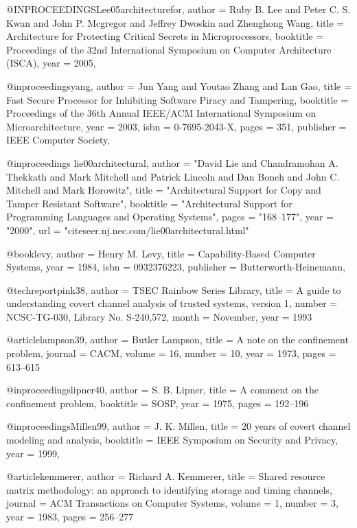 @INPROCEEDINGS{Lee05architecturefor,
    author = {Ruby B. Lee and Peter C. S. Kwan and John P. Mcgregor and Jeffrey Dwoskin and Zhenghong Wang},
    title = {Architecture for Protecting Critical Secrets in Microprocessors},
    booktitle = {Proceedings of the 32nd International Symposium on Computer Architecture (ISCA)},
    year = {2005},
}

@inproceedings{yang,
 author = {Jun Yang and Youtao Zhang and Lan Gao},
 title = {Fast Secure Processor for Inhibiting Software Piracy and Tampering},
 booktitle = {Proceedings of the 36th Annual IEEE/ACM International Symposium on Microarchitecture},
 year = {2003},
 isbn = {0-7695-2043-X},
 pages = {351},
 publisher = {IEEE Computer Society},
 }

@inproceedings{ lie00architectural,
    author = "David Lie and Chandramohan A. Thekkath and Mark Mitchell and Patrick Lincoln and Dan Boneh and John C. Mitchell and Mark Horowitz",
    title = "{Architectural Support for Copy and Tamper Resistant Software}",
    booktitle = "Architectural Support for Programming Languages and Operating Systems",
    pages = "168--177",
    year = "2000",
    url = "citeseer.nj.nec.com/lie00architectural.html" }

@book{levy,
 author = {Henry M. Levy},
 title = {Capability-Based Computer Systems},
 year = {1984},
 isbn = {0932376223},
 publisher = {Butterworth-Heinemann},
 }

@techreport{pink38,
author = {{TSEC Rainbow Series Library}},
title = {A guide to understanding covert channel analysis of trusted systems, version 1},
number = {NCSC-TG-030, Library No. S-240,572},
month = November,
year = 1993}

@article{lampson39,
author = {Butler Lampson},
title = {A note on the confinement problem},
journal = {{CACM}},
volume = 16,
number = 10,
year = 1973,
pages = {613--615}}

@inproceedings{lipner40,
author = {S. B. Lipner},
title = {A comment on the confinement problem},
booktitle = {{SOSP}},
year = 1975,
pages = {192--196}}

@inproceedings{Millen99,
author = {J. K. Millen},
title = {20 years of covert channel modeling and analysis},
booktitle = {{IEEE} Symposium on Security and Privacy},
year = 1999,
}

@article{kemmerer,
author = {Richard A. Kemmerer},
title = {Shared resource matrix methodology: an approach to identifying storage and timing channels},
journal = {{ACM} Transactions on Computer Systems},
volume = 1,
number = 3,
year = 1983,
pages = {256--277}}

